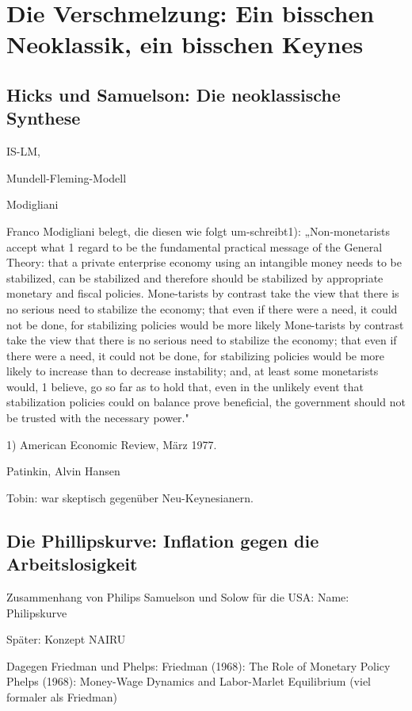 %
%
%

\chapter{Die Verschmelzung: Ein bisschen Neoklassik, ein bisschen Keynes}
\label{Synthese}

\section{Hicks und Samuelson: Die neoklassische Synthese}

IS-LM, 


Mundell-Fleming-Modell


Modigliani

Franco Modigliani belegt, die diesen wie folgt um-schreibt1): „Non-monetarists accept what 1 regard to be the fundamental practical message of the General Theory: that a private enterprise economy using an intangible money needs to be stabilized, can be stabilized and therefore should be stabilized by appropriate monetary and fiscal policies. Mone-tarists by contrast take the view that there is no serious need to stabilize the economy; that even if there were a need, it could not be done, for stabilizing policies would be more likely
Mone-tarists by contrast take the view that there is no serious need to stabilize the economy; that even if there were a need, it could not be done, for stabilizing policies would be more likely to increase than to decrease instability; and, at least some monetarists would, 1 believe, go so far as to hold that, even in the unlikely event that stabilization policies could on balance prove beneficial, the government should not be trusted with the necessary power."

1) American Economic Review, März 1977.

Patinkin, Alvin Hansen

Tobin: war skeptisch gegenüber Neu-Keynesianern. \textcite[S. 398]{Snowdon2005}

\section{Die Phillipskurve: Inflation gegen die Arbeitslosigkeit} \label{sec: Phillips}

Zusammenhang von Philips
Samuelson und Solow für die USA: Name: Philipskurve


Später: Konzept NAIRU


Dagegen Friedman und Phelps:
Friedman (1968): The Role of Monetary Policy
Phelps (1968): Money-Wage Dynamics and Labor-Marlet Equilibrium (viel formaler als Friedman)



